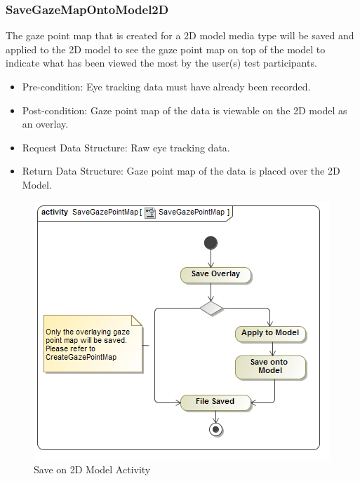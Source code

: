	
	\subsubsection{SaveGazeMapOntoModel2D}
The gaze point map that is created for a 2D model media type will be saved and applied to the 2D model to see the gaze point map on top of the model to indicate what has been viewed the most by the user(s) test participants.
	\begin{itemize}
		\item Pre-condition: Eye tracking data must have already been recorded.
		\item Post-condition: Gaze point map of the data is viewable on the 2D model as an overlay.
		\item Request Data Structure: Raw eye tracking data.
		\item Return Data Structure: Gaze point map of the data is placed over the 2D Model.
	\end{itemize}
	\begin{figure}[!ht]
		\centering	
		\includegraphics[scale=0.5]{Diagrams/Activity_Diagram__SaveGazePointMap__SaveGazePointMap.png}	
		\caption{Save on 2D Model Activity}
	\end{figure}

